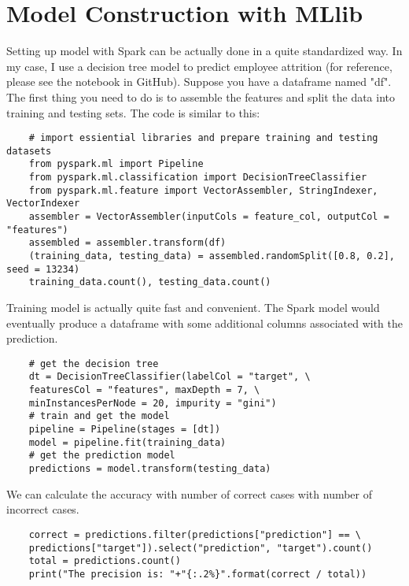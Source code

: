 \documentclass[a4paper, 12pt]{article}
\begin{document}
    \section*{Model Construction with MLlib}
    Setting up model with Spark can be actually done in a  quite standardized way. In my case, I use 
    a decision tree model to predict employee attrition (for reference, please see the notebook in GitHub). 
    Suppose you have a dataframe named "df". The first thing you need to do is to assemble the features 
    and split the data into training and testing sets. The code is similar to this:
    \begin{verbatim}
    # import essiential libraries and prepare training and testing datasets
    from pyspark.ml import Pipeline
    from pyspark.ml.classification import DecisionTreeClassifier
    from pyspark.ml.feature import VectorAssembler, StringIndexer, VectorIndexer
    assembler = VectorAssembler(inputCols = feature_col, outputCol = "features")
    assembled = assembler.transform(df)
    (training_data, testing_data) = assembled.randomSplit([0.8, 0.2], seed = 13234)
    training_data.count(), testing_data.count()
    \end{verbatim}

    Training model is actually quite fast and convenient. The Spark model would eventually produce
    a dataframe with some additional columns associated with the prediction.
    \begin{verbatim}
    # get the decision tree
    dt = DecisionTreeClassifier(labelCol = "target", \
    featuresCol = "features", maxDepth = 7, \
    minInstancesPerNode = 20, impurity = "gini")
    # train and get the model
    pipeline = Pipeline(stages = [dt])
    model = pipeline.fit(training_data)
    # get the prediction model
    predictions = model.transform(testing_data)
    \end{verbatim}
    
    We can calculate the accuracy with number of correct cases with number of incorrect cases.
    \begin{verbatim}
    correct = predictions.filter(predictions["prediction"] == \
    predictions["target"]).select("prediction", "target").count()
    total = predictions.count()
    print("The precision is: "+"{:.2%}".format(correct / total))
    \end{verbatim}
\end{document}
